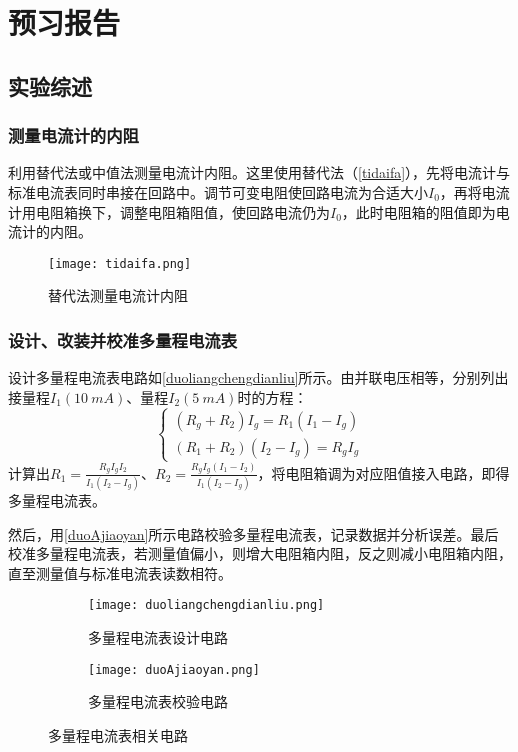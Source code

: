 \documentclass[]{../template/Report}
\begin{document}
\makecover

\section{预习报告}
\subsection{实验综述}
\subsubsection{测量电流计的内阻}
    利用替代法或中值法测量电流计内阻。这里使用替代法（\autoref{tidaifa}），先将电流计与标准电流表同时串接在回路中。调节可变电阻使回路电流为合适大小$I_0$，再将电流计用电阻箱换下，调整电阻箱阻值，使回路电流仍为$I_0$，此时电阻箱的阻值即为电流计的内阻。
    \begin{figure}[htbp]
        \centering
        \texttt{[image: tidaifa.png]}
        \caption{替代法测量电流计内阻}
        \label{tidaifa}
    \end{figure}

\subsubsection{设计、改装并校准多量程电流表}
    设计多量程电流表电路如\autoref{duoliangchengdianliu}所示。由并联电压相等，分别列出接量程$I_1(\SI{10}{mA})$、量程$I_2(\SI{5}{mA})$时的方程：
    \begin{equation}
        \begin{cases}
            (R_g+R_2)I_g = R_1 (I_1 - I_g)\\
            (R_1+R_2)(I_2 - I_g) = R_g I_g
        \end{cases}
    \end{equation}
    计算出$R_1 = \frac{R_gI_gI_2}{I_1(I_2-I_g)}$、$R_2 = \frac{R_gI_g(I_1-I_2)}{I_1(I_2-I_g)}$，将电阻箱调为对应阻值接入电路，即得多量程电流表。

    然后，用\autoref{duoAjiaoyan}所示电路校验多量程电流表，记录数据并分析误差。最后校准多量程电流表，若测量值偏小，则增大电阻箱内阻，反之则减小电阻箱内阻，直至测量值与标准电流表读数相符。
    \begin{figure}[htbp]
        \centering
        \begin{subfigure}[b]{0.45\textwidth}
            \texttt{[image: duoliangchengdianliu.png]}
            \caption{多量程电流表设计电路}
            \label{duoliangchengdianliu}
        \end{subfigure}
        \hfill
        \begin{subfigure}[b]{0.45\textwidth}
            \texttt{[image: duoAjiaoyan.png]}
            \caption{多量程电流表校验电路}
            \label{duoAjiaoyan}
        \end{subfigure}
    \caption{多量程电流表相关电路}
    \end{figure}
\end{document}
